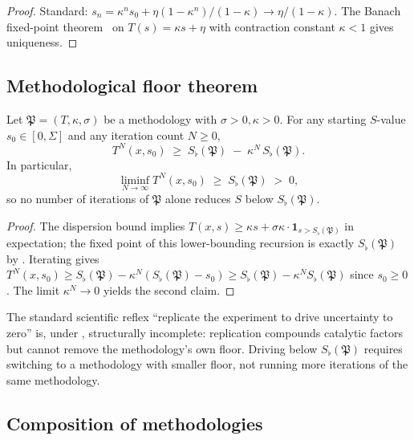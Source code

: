 \documentclass[twocolumn,11pt,a4paper]{article}
\newcommand{\Method}{\mathfrak{P}}
\newcommand{\Sfloor}{S_{\flat}}
\begin{document}
\begin{proof}
Standard: $s_n=\kappa^n s_0+\eta(1-\kappa^n)/(1-\kappa)\to\eta/(1-\kappa)$.
The Banach fixed-point theorem~\cite{banach1922} on
$T(s)=\kappa s+\eta$ with contraction constant $\kappa<1$ gives
uniqueness.
\end{proof}

\subsection{Methodological floor theorem}

\begin{theorem}\label{thm:method-floor}
Let $\Method=(T,\kappa,\sigma)$ be a methodology with $\sigma>0,\kappa>0$.
For any starting $S$-value $s_0\in[0,\Sigma]$ and any iteration count
$N\ge 0$,
\[
T^N(x,s_0)\;\ge\;\Sfloor(\Method)\;-\;\kappa^N\,\Sfloor(\Method).
\]
In particular,
\[
\liminf_{N\to\infty}T^N(x,s_0)\;\ge\;\Sfloor(\Method)\;>\;0,
\]
so no number of iterations of $\Method$ alone reduces $S$ below
$\Sfloor(\Method)$.
\end{theorem}

\begin{proof}
The dispersion bound implies
$T(x,s)\ge\kappa s+\sigma\kappa\cdot\mathbf{1}_{s>\Sfloor(\Method)}$ in
expectation; the fixed point of this lower-bounding recursion is exactly
$\Sfloor(\Method)$ by . Iterating gives
$T^N(x,s_0)\ge\Sfloor(\Method)-\kappa^N(\Sfloor(\Method)-s_0)\ge
\Sfloor(\Method)-\kappa^N\Sfloor(\Method)$ since $s_0\ge 0$. The limit
$\kappa^N\to 0$ yields the second claim.
\end{proof}

\begin{remark}\label{rem:replication}
The standard scientific reflex ``replicate the experiment to drive
uncertainty to zero'' is, under , structurally
incomplete: replication compounds catalytic factors but cannot remove the
methodology's own floor. Driving below
$\Sfloor(\Method)$ requires switching to a methodology with smaller
floor, not running more iterations of the same methodology.
\end{remark}

\subsection{Composition of methodologies}
\end{document}
